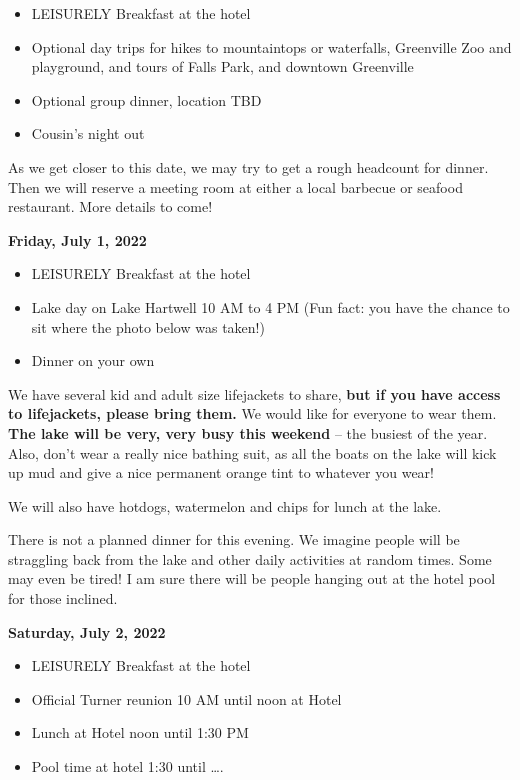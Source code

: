 \documentclass[
]{book}
\providecommand{\tightlist}{%
  \setlength{\itemsep}{0pt}\setlength{\parskip}{0pt}}
\begin{document}
\begin{itemize}
\tightlist
\item
  LEISURELY Breakfast at the hotel
\item
  Optional day trips for hikes to mountaintops or waterfalls, Greenville Zoo and playground, and tours of Falls Park, and downtown Greenville
\item
  Optional group dinner, location TBD
\item
  Cousin's night out
\end{itemize}

As we get closer to this date, we may try to get a rough headcount for dinner. Then we will reserve a meeting room at either a local barbecue or seafood restaurant. More details to come!

\textbf{Friday, July 1, 2022}

\begin{itemize}
\tightlist
\item
  LEISURELY Breakfast at the hotel
\item
  Lake day on Lake Hartwell 10 AM to 4 PM (Fun fact: you have the chance to sit where the photo below was taken!)
\item
  Dinner on your own
\end{itemize}

We have several kid and adult size lifejackets to share, \textbf{but if you have access to lifejackets, please bring them.} We would like for everyone to wear them. \textbf{The lake will be very, very busy this weekend} -- the busiest of the year. Also, don't wear a really nice bathing suit, as all the boats on the lake will kick up mud and give a nice permanent orange tint to whatever you wear!

We will also have hotdogs, watermelon and chips for lunch at the lake.

There is not a planned dinner for this evening. We imagine people will be straggling back from the lake and other daily activities at random times. Some may even be tired! I am sure there will be people hanging out at the hotel pool for those inclined.

\textbf{Saturday, July 2, 2022}

\begin{itemize}
\tightlist
\item
  LEISURELY Breakfast at the hotel
\item
  Official Turner reunion 10 AM until noon at Hotel
\item
  Lunch at Hotel noon until 1:30 PM
\item
  Pool time at hotel 1:30 until \ldots.
\end{itemize}
\end{document}
